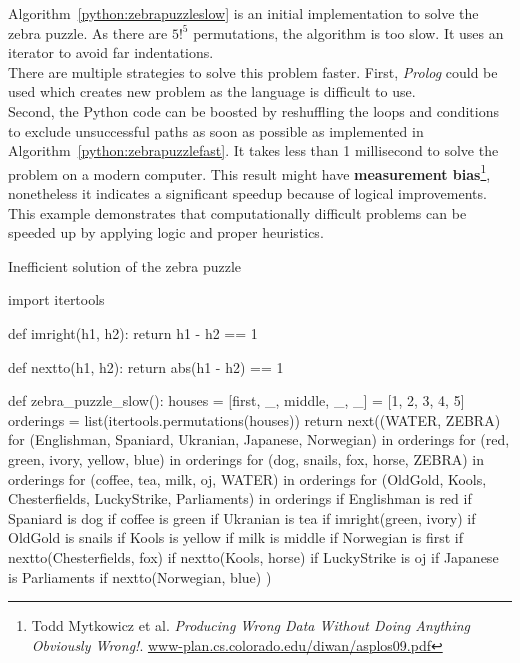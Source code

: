 \documentclass{report}
\begin{document}
Algorithm~\ref{python:zebrapuzzleslow} is an initial implementation to solve the zebra puzzle. As there are $5!^5$ permutations, the algorithm is too slow. It uses an iterator to avoid far indentations.
\\
There are multiple strategies to solve this problem faster. First, {\em Prolog} could be used which creates new problem as the language is difficult to use.
\\
Second, the Python code can be boosted by reshuffling the loops and conditions to exclude unsuccessful paths as soon as possible as implemented in Algorithm~\ref{python:zebrapuzzlefast}.
It takes less than 1 millisecond to solve the problem on a modern computer.
This result might have {\bf measurement bias}\footnote{Todd Mytkowicz et al. {\em Producing Wrong Data Without Doing Anything Obviously Wrong!}. \url{www-plan.cs.colorado.edu/diwan/asplos09.pdf}}, nonetheless it indicates a significant speedup because of logical improvements.
\\
This example demonstrates that computationally difficult problems can be speeded up by applying logic and proper heuristics.

\begin{algorithm}
\caption{Inefficient solution of the zebra puzzle}
\label{python:zebrapuzzleslow}
\begin{python}
import itertools

def imright(h1, h2): return h1 - h2  == 1

def nextto(h1, h2): return abs(h1 - h2) == 1

def zebra_puzzle_slow():
    houses = [first, _, middle, _, _] = [1, 2, 3, 4, 5]
    orderings = list(itertools.permutations(houses))
    return next((WATER, ZEBRA)
                for (Englishman, Spaniard, Ukranian,
                        Japanese, Norwegian) in orderings
                for (red, green, ivory, yellow, blue) in orderings
                for (dog, snails, fox, horse, ZEBRA) in orderings
                for (coffee, tea, milk, oj, WATER) in orderings
                for (OldGold, Kools, Chesterfields, LuckyStrike,
                        Parliaments) in orderings
                if Englishman is red
                if Spaniard is dog
                if coffee is green
                if Ukranian is tea
                if imright(green, ivory)
                if OldGold is snails
                if Kools is yellow
                if milk is middle
                if Norwegian is first
                if nextto(Chesterfields, fox)
                if nextto(Kools, horse)
                if LuckyStrike is oj
                if Japanese is Parliaments
                if nextto(Norwegian, blue)
                )
\end{python}
\end{algorithm}
\end{document}

